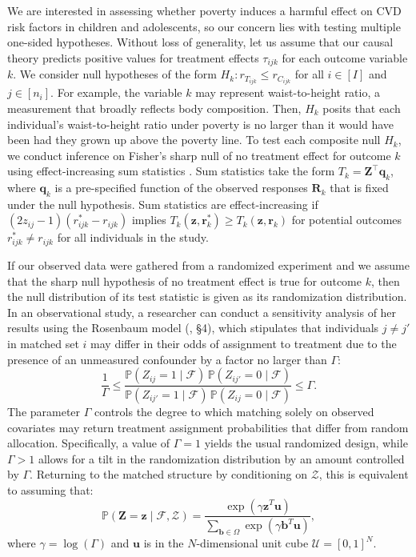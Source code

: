 \documentclass[12pt,leqno,titlepage]{amsart}
\renewcommand{\P}{\mathbb{P}}
\newcommand{\1}{\mathbbm{1}}
\begin{document}
\begin{bibunit}
We are interested in assessing whether poverty induces a harmful effect on CVD risk factors in children and adolescents, so our concern lies with testing multiple one-sided hypotheses. Without loss of generality, let us assume that our causal theory predicts positive values for treatment effects $\tau_{ijk}$ for each outcome variable $k$. We consider null hypotheses of the form
$H_k : r_{T_{ijk}} \leq r_{C_{ijk}}$ for all $ i \in [I]$ and $j \in [n_i].$
For example, the variable $k$ may represent waist-to-height ratio, a measurement that broadly reflects body composition. Then, $H_k$ posits that each individual's waist-to-height ratio under poverty is no larger than it would have been had they grown up above the poverty line.
To test each composite null $H_k$, we conduct inference on Fisher's sharp null of no treatment effect for outcome $k$ using effect-increasing sum statistics \citep[\S 4]{caughey2023randomisation}. Sum statistics take the form $T_k = \mathbf{Z}^\top\mathbf{q}_k$, where $\mathbf{q}_k$ is a pre-specified function of the observed responses $\mathbf{R}_k$ that is fixed under the null hypothesis. Sum statistics are effect-increasing if $(2z_{ij}-1)({r}^*_{ijk}-{r}_{ijk})$ implies $T_k(\mathbf{z},\mathbf{r}^*_k) \geq T_k(\mathbf{z},\mathbf{r}_k)$ for potential outcomes ${r}^*_{ijk} \neq {r}_{ijk}$ for all individuals in the study.

If our observed data were gathered from a randomized experiment and we assume that the sharp null hypothesis of no treatment effect is true for outcome $k$, then
the null distribution of its test statistic is given as its randomization distribution.
In an observational study, a researcher can conduct a sensitivity analysis of her results using the Rosenbaum model (\citeyear{rosenbaum2002covariance}, \S 4), which stipulates that individuals $j \neq j'$ in matched set $i$ may differ in their odds of assignment to treatment due to the presence of an unmeasured confounder by a factor no larger than $\Gamma$:
\begin{equation} \label{sensitivity-model1}
    \frac{1}{\Gamma} \leq \dfrac{ \P(Z_{ij}=1\mid\mathcal F)\, \P(Z_{ij'}=0\mid\mathcal F) }{ \P(Z_{ij'}=1\mid\mathcal F)\,\P(Z_{ij}=0\mid\mathcal F) } \leq \Gamma.
\end{equation}
The parameter $\Gamma$ controls the degree to which matching solely on observed covariates may return treatment assignment probabilities that differ from random allocation. Specifically, a value of $\Gamma = 1$ yields the usual randomized design, while $\Gamma > 1$ allows for a tilt in the randomization distribution by an amount controlled by $\Gamma$. Returning to the matched structure by conditioning on $\mathcal{Z}$, this is equivalent to assuming that:
\begin{equation} \label{sensitivity-model2}
    \P (\mathbf{Z} = \mathbf{z} \mid \mathcal{F}, \mathcal{Z}) = \frac{\exp(\gamma \mathbf{z}^T \mathbf{u})}{\sum_{\mathbf{b} \in \Omega} \exp(\gamma \mathbf{b}^T \mathbf{u})},
\end{equation}
where $\gamma = \log(\Gamma)$ and $\mathbf{u}$ is in the $N$-dimensional unit cube $\mathcal{U} = [0, 1]^N$. %


\end{bibunit}
\end{document}
